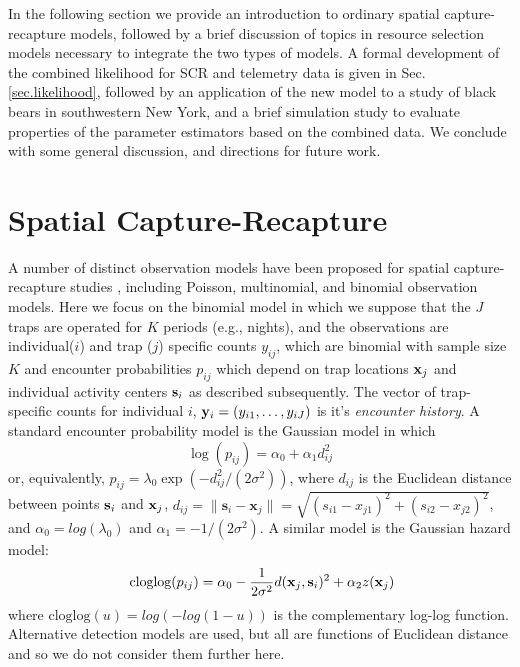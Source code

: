 \documentclass[12pt]{article}
\begin{document}
In the following section we provide an introduction to ordinary
spatial capture-recapture models, followed by a brief discussion of
topics in resource selection models necessary to integrate the two
types of models. A formal development of the combined likelihood for
SCR and telemetry data is given in Sec. \ref{sec.likelihood}, followed
by an application of the new model to a study of black bears in
southwestern New York, and a brief simulation study to evaluate
properties of the parameter estimators based on the combined data. We
conclude with some general discussion, and directions for future work.


\section{Spatial Capture-Recapture}

A number of distinct observation models have been proposed for spatial
capture-recapture studies \citep{borchers_efford:2008,
  royle_etal:2009ecol, efford_etal:2009ecol}, including Poisson,
multinomial, and binomial observation models.
Here we focus on the binomial model in which we suppose that the $J$
traps
are operated for $K$ periods (e.g., nights), and the observations are
individual($i$) and trap ($j$) specific counts $y_{ij}$, which are binomial with
sample size $K$ and encounter probabilities $p_{ij}$ which depend on
trap locations ${\bf x}_{j}$ and individual activity centers ${\bf
  s}_{i}$ as described subsequently.  The vector of trap-specific
counts for individual $i$, ${\bf y}_{i} = (y_{i1},\ldots,y_{iJ})$ is
it's {\it encounter history}.  A standard encounter probability model
\citep{borchers_efford:2008} is the Gaussian model in which
\begin{equation}
\log(p_{ij})= \alpha_{0} + \alpha_{1} d_{ij}^{2}
\label{eq.encounter}
\end{equation}
or, equivalently,
$p_{ij} = \lambda_{0} \exp(-d_{ij}^{2} /(2\sigma^{2}) )$,
where %
$d_{ij}$ is the Euclidean
distance between points ${\bf s}_{i}$ and ${\bf x}_{j}$,
$d_{ij} = \|\textbf{s}_i - \textbf{x}_j\| = \sqrt{(s_{i1}-x_{j1})^2 +
  (s_{i2}-x_{j2})^2}$,
and
 $\alpha_{0} = log(\lambda_{0})$ and $\alpha_{1} = -1/(2\sigma^2)$.
A similar model is the Gaussian hazard model:
\begin{equation}
\mbox{ cloglog}(p_{ij}) = \alpha_{0}  -\frac{1}{2\sigma^{2}}
d({\bf x}_{j},{\bf s}_{i})^{2} + \alpha_{2}  z({\bf x}_{j})
\label{eq.hazard}
\end{equation}
where $\mbox{cloglog}(u) = log(-log(1-u))$ is the complementary
log-log function. 
Alternative detection models are used, but all are
functions of Euclidean distance and so we do not consider them
further here.
\end{document}
